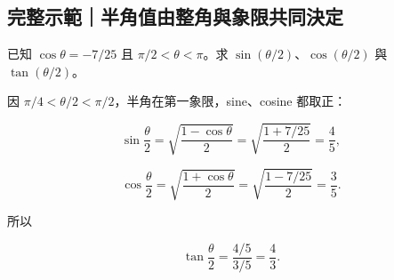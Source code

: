 \documentclass[11pt,a4paper]{article}
\begin{document}
\begin{HandoutWorkedExample}

\subsection{完整示範｜半角值由整角與象限共同決定}\label{ux5b8cux6574ux793aux7bc4ux534aux89d2ux503cux7531ux6574ux89d2ux8207ux8c61ux9650ux5171ux540cux6c7aux5b9a}

已知 \(\cos\theta=-7/25\) 且 \(\pi/2<\theta<\pi\)。求 \(\sin(\theta/2)\)、\(\cos(\theta/2)\) 與 \(\tan(\theta/2)\)。

因 \(\pi/4<\theta/2<\pi/2\)，半角在第一象限，sine、cosine 都取正：

\[
\sin\frac\theta2
=\sqrt{\frac{1-\cos\theta}{2}}
=\sqrt{\frac{1+7/25}{2}}
=\boxed{\frac45},
\]

\[
\cos\frac\theta2
=\sqrt{\frac{1+\cos\theta}{2}}
=\sqrt{\frac{1-7/25}{2}}
=\boxed{\frac35}.
\]

所以

\[
\tan\frac\theta2=\frac{4/5}{3/5}=\boxed{\frac43}.
\]

\end{HandoutWorkedExample}
\end{document}
